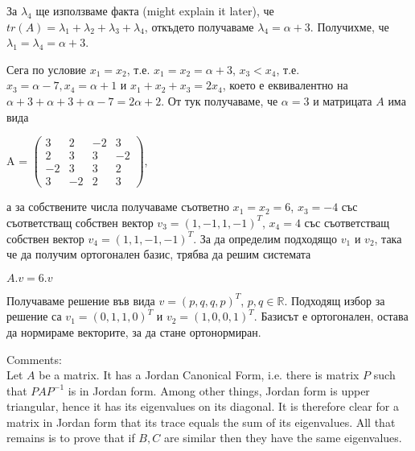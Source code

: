\documentclass{article}
\begin{document}
\justify
За $\lambda_4$ ще използваме факта (might explain it later), че $tr(A) = \lambda_1 + \lambda_2 + \lambda_3 + \lambda_4$, откъдето получаваме $\lambda_4 = \alpha + 3$. Получихме, че $\lambda_1 = \lambda_4 = \alpha + 3$.

\justify
Сега по условие $x_1 = x_2$, т.е. $x_1 = x_ 2 = \alpha + 3$, $x_3 < x_4$, т.е. $x_3 = \alpha - 7, x_4 = \alpha + 1$ и $x_1 + x_2 + x_3 = 2x_4$, което е еквивалентно на $\alpha + 3 + \alpha + 3 + \alpha - 7 = 2\alpha + 2$. От тук получаваме, че $\alpha = 3$ и матрицата $A$ има вида

\begin{center}
    A = $\begin{pmatrix}
         3 & 2 & -2 & 3 \\
         2 & 3 & 3 & -2 \\
         -2 & 3 & 3 & 2 \\
         3 & -2 & 2 & 3
         \end{pmatrix}$,
\end{center}

\justify
а за собствените числа получаваме съответно $x_1 = x_2 = 6$, $x_3 = -4$ със съответстващ собствен вектор $v_3 = (1,-1,1,-1)^T$, $x_4 = 4$ със съответстващ собствен вектор $v_4 = (1,1,-1,-1)^T$. За да определим подходящо $v_1$ и $v_2$, така че да получим ортогонален базис, трябва да решим системата 

\begin{center}
    $A.v = 6.v$
\end{center}

\justify
Получаваме решение във вида $v = (p,q,q,p)^T$, $p,q \in \mathbb{R}$. Подходящ избор за решение са $v_1 = (0,1,1,0)^T$ и $v_2 = (1,0,0,1)^T$. Базисът е ортогонален, остава да нормираме векторите, за да стане ортонормиран.

\justify
Comments: \\
Let $A$ be a matrix.  It has a Jordan Canonical Form, i.e. there is matrix $P$ such that $PAP^{-1}$ is in Jordan form.  Among other things, Jordan form is upper triangular, hence it has its eigenvalues on its diagonal.  It is therefore clear for a matrix in Jordan form that its trace equals the sum of its eigenvalues.  All that remains is to prove that if $B,C$ are similar then they have the same eigenvalues.
\end{document}
